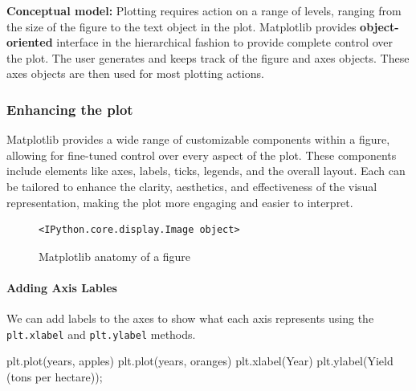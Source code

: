 \documentclass[
  letterpaper,
  DIV=11,
  numbers=noendperiod]{scrreprt}
\let\oldparagraph\paragraph
\renewcommand{\paragraph}[1]{\oldparagraph{#1}\mbox{}}
\newenvironment{Shaded}{\begin{snugshade}}{\end{snugshade}}
\newcommand{\NormalTok}[1]{\textcolor[rgb]{0.00,0.23,0.31}{#1}}
\newcommand{\OperatorTok}[1]{\textcolor[rgb]{0.37,0.37,0.37}{#1}}
\newcommand{\StringTok}[1]{\textcolor[rgb]{0.13,0.47,0.30}{#1}}
\begin{document}
\textbf{Conceptual model:} Plotting requires action on a range of
levels, ranging from the size of the figure to the text object in the
plot. Matplotlib provides \textbf{object-oriented} interface in the
hierarchical fashion to provide complete control over the plot. The user
generates and keeps track of the figure and axes objects. These axes
objects are then used for most plotting actions.

\hypertarget{enhancing-the-plot}{%
\subsubsection{Enhancing the plot}\label{enhancing-the-plot}}

Matplotlib provides a wide range of customizable components within a
figure, allowing for fine-tuned control over every aspect of the plot.
These components include elements like axes, labels, ticks, legends, and
the overall layout. Each can be tailored to enhance the clarity,
aesthetics, and effectiveness of the visual representation, making the
plot more engaging and easier to interpret.

\begin{figure}

{\centering 

\begin{verbatim}
<IPython.core.display.Image object>
\end{verbatim}

}

\caption{\label{fig-anatomy}Matplotlib anatomy of a figure}

\end{figure}

\hypertarget{adding-axis-lables}{%
\paragraph{Adding Axis Lables}\label{adding-axis-lables}}

We can add labels to the axes to show what each axis represents using
the \texttt{plt.xlabel} and \texttt{plt.ylabel} methods.

\begin{Shaded}
\begin{Highlighting}[]
\NormalTok{plt.plot(years, apples)}
\NormalTok{plt.plot(years, oranges)}
\NormalTok{plt.xlabel(}\StringTok{\textquotesingle{}Year\textquotesingle{}}\NormalTok{)}
\NormalTok{plt.ylabel(}\StringTok{\textquotesingle{}Yield (tons per hectare)\textquotesingle{}}\NormalTok{)}\OperatorTok{;}
\end{Highlighting}
\end{Shaded}
\end{document}

